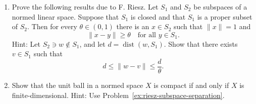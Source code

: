 \begin{enumerate}[label=\thesection.\arabic*.,ref=\thesection.\arabic*,start=39,series=book-problems]
\item\label{ex:riesz-subspace-separation} Prove the following results due to F. Riesz. Let $S_1$ and $S_2$ be subspaces of a normed linear space. Suppose that $S_1$ is closed and that $S_1$ is a proper subset of $S_2$. Then for every $\theta\in(0,1)$ there is an $x\in S_2$ such that $\|x\|=1$ and
\begin{equation}\label{eq:riesz-subspace-separation-problem}
\|x-y\|\geq\theta\quad\text{for all }y\in S_1.
\end{equation}
Hint: Let $S_2\ni w\notin S_1$, and let $d=\operatorname{dist}(w,S_1)$. Show that there exists $v\in S_1$ such that
\begin{equation}\label{eq:riesz-subspace-separation-distance-hint}
d\leq\|w-v\|\leq\dfrac{d}{\theta}.
\end{equation}


\item\label{ex:infinite-dimensional-identity-noncompact} Show that the unit ball in a normed space $X$ is compact if and only if $X$ is finite-dimensional. Hint: Use Problem~\ref{ex:riesz-subspace-separation}.

\end{enumerate}
